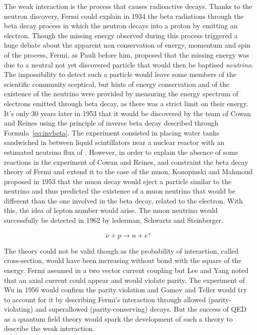 	The weak interaction is the process that causes radioactive decays. Thanks to the neutron discovery, Fermi could explain in 1934 the beta radiations through the beta decay process in which the neutron decays into a proton by emitting an electron. Though the missing energy observed during this process triggered a huge debate about the apparent non conservation of energy, momentum and spin of the process, Fermi, as Pauli before him, proposed that the missing energy was due to a neutral not yet discovered particle that would then be baptised \textit{neutrino}. The impossibility to detect such a particle would leave some members of the scientific community sceptical, but hints of energy conservation and of the existence of the neutrino were provided by measuring the energy spectrum of electrons emitted through beta decay, as there was a strict limit on their energy. It's only 30 years later in 1953 that it would be discovered by the team of Cowan and Reines using the principle of inverse beta decay described through Formula~\ref{eq:invbeta}. The experiment consisted in placing water tanks sandwiched in between liquid scintillators near a nuclear reactor with an estimated neutrino flux of \siflux. However, in order to explain the absence of some reactions in the experiment of Cowan and Reines, and constraint the beta decay theory of Fermi and extend it to the case of the muon, Konopinski and Mahmoud proposed in 1953 that the muon decay would eject a particle similar to the neutrino and thus predicted the existence of a muon neutrino that would be different than the one involved in the beta decay, related to the electron. With this, the idea of lepton number would arise. The muon neutrino would successfully be detected in 1962 by lederman, Schwartz and Steinberger.
	
	\begin{equation}
		\label{eq:invbeta}
		\overline{\nu} + p \rightarrow n + e^+
	\end{equation}
	
	The theory could not be valid though as the probability of interaction, called cross-section, would have been increasing without bond with the square of the energy. Fermi assumed in a two vector current coupling but Lee and Yang noted that an axial current could appear and would violate parity. The experiment of Wu in 1956 would confirm the parity violation and Gamov and Teller would try to account for it by describing Fermi's interaction through allowed (parity-violating) and superallowed (parity-conserving) decays. But the success of QED as a quantum field theory would spark the development of such a theory to describe the weak interaction.
	
